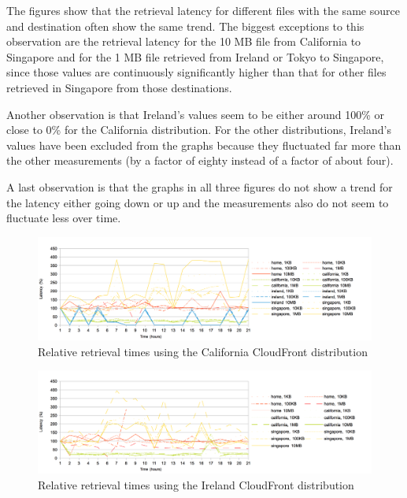 \documentclass[conference]{IEEEtran}
\begin{document}
The figures show that the retrieval latency for different files with the same source and destination often show the same trend. The biggest exceptions to this observation are the retrieval latency for the 10 MB file from California to Singapore and for the 1 MB file retrieved from Ireland or Tokyo to Singapore, since those values are continuously significantly higher than that for other files retrieved in Singapore from those destinations.

Another observation is that Ireland's values seem to be either around 100\% or close to 0\% for the California distribution. For the other distributions, Ireland's values have been excluded from the graphs because they fluctuated far more than the other measurements (by a factor of eighty instead of a factor of about four).

A last observation is that the graphs in all three figures do not show a trend for the latency either going down or up and the measurements also do not seem to fluctuate less over time.


\begin{figure}[]
    \centering
    \includegraphics[width=\linewidth]{images/california_relative.png}
    \caption[]{Relative retrieval times using the California CloudFront distribution}
    \label{fig:california_relative}
\end{figure}

\begin{figure}[]
    \centering
    \includegraphics[width=\linewidth]{images/ireland_relative.png}
    \caption[]{Relative retrieval times using the Ireland CloudFront distribution}
    \label{fig:ireland_relative}
\end{figure}
\end{document}
